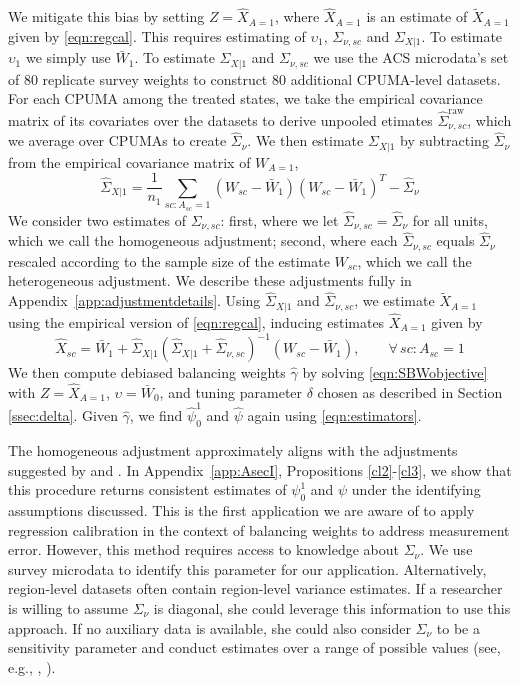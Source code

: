 \documentclass[aoas]{imsart}
\theoremstyle{plain}
\theoremstyle{remark}
\begin{document}
We mitigate this bias by setting $Z = \hat{X}_{A=1}$, where $\hat{X}_{A=1}$ is an estimate of $\tilde{X}_{A=1}$ given by \eqref{eqn:regcal}. This requires estimating of $\upsilon_1$, $\Sigma_{\nu, sc}$ and $\Sigma_{X|1}$. To estimate $\upsilon_1$ we simply use $\bar{W}_1$. To estimate $\Sigma_{X|1}$ and $\Sigma_{\nu,sc}$ we use the ACS microdata's set of 80 replicate survey weights to construct 80 additional CPUMA-level datasets. For each CPUMA among the treated states, we take the empirical covariance matrix of its covariates over the datasets to derive unpooled etimates $\hat{\Sigma}_{\nu,sc}^{\text{raw}}$, which we average over CPUMAs to create $\hat{\Sigma}_{\nu}$. We then estimate $\Sigma_{X|1}$ by subtracting $\hat{\Sigma}_{\nu}$ from the empirical covariance matrix of $W_{A=1}$,
\[ \hat{\Sigma}_{X|1} = \frac{1}{n_1} \sum_{sc:A_{sc}=1} (W_{sc} - \bar{W}_1)(W_{sc} - \bar{W}_1)^T - \hat{\Sigma}_{\nu}\]
We consider two estimates of $\Sigma_{\nu, sc}$: first, where we let $\hat{\Sigma}_{\nu,sc} = \hat{\Sigma}_{\nu}$ for all units, which we call the homogeneous adjustment; second, where each $\hat{\Sigma}_{\nu, sc}$ equals $\hat{\Sigma}_{\nu}$ rescaled according to the sample size of the estimate $W_{sc}$, which we call the heterogeneous adjustment. We describe these adjustments fully in Appendix~\ref{app:adjustmentdetails}. Using $\hat{\Sigma}_{X|1}$ and $\hat{\Sigma}_{\nu, sc}$, we estimate $\tilde{X}_{A=1}$ using the empirical version of \eqref{eqn:regcal}, inducing estimates $\hat{X}_{A=1}$ given by
\begin{equation}\label{eqn:hatX}
\hat{X}_{sc} = \bar{W}_1 + \hat{\Sigma}_{X|1} (\hat{\Sigma}_{X|1} + \hat{\Sigma}_{\nu,sc})^{-1}  (W_{sc} - \bar{W}_1), \qquad \forall\, sc: A_{sc}=1
\end{equation}
We then compute debiased balancing weights $\hat{\gamma}$ by solving \eqref{eqn:SBWobjective} with $Z = \hat{X}_{A=1}$, $\upsilon = \bar{W}_0$, and tuning parameter $\delta$ chosen as described in Section \ref{ssec:delta}. Given $\hat{\gamma}$, we find $\hat{\psi}_0^1$ and $\hat{\psi}$ again using \eqref{eqn:estimators}.

The homogeneous adjustment approximately aligns with the adjustments suggested by \cite{carroll2006measurement} and \cite{gleser1992importance}. In Appendix~\ref{app:AsecI}, Propositions \ref{cl2}-\ref{cl3}, we show that this procedure returns consistent estimates of $\psi_0^1$ and $\psi$ under the identifying assumptions discussed. This is the first application we are aware of to apply regression calibration in the context of balancing weights to address measurement error. However, this method requires access to knowledge about $\Sigma_{\nu}$. We use survey microdata to identify this parameter for our application. Alternatively, region-level datasets often contain region-level variance estimates. If a researcher is willing to assume $\Sigma_{\nu}$ is diagonal, she could leverage this information to use this approach. If no auxiliary data is available, she could also consider $\Sigma_{\nu}$ to be a sensitivity parameter and conduct estimates over a range of possible values (see, e.g., \cite{illenberger2020impact}, \cite{huque2014impact}). 
\end{document}
